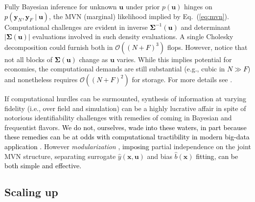 \documentclass[12pt]{article}
\newcommand{\blunew}[1]{\textcolor{black}{#1}} %
\begin{document}
Fully Bayesian inference for unknown $\mathbf{u}$
under prior $p(\mathbf{u})$ hinges on \blunew{$p(
\mathbf{y}_{N}, \mathbf{y}_{F} \mid \mathbf{u})$}, the MVN (marginal)
likelihood implied by Eq.~(\ref{eq:mvn}). Computational challenges
are evident in inverse \blunew{$\mathbf{\Sigma}^{-1}(\mathbf{u})$} and determinant
\blunew{$|\mathbf{\Sigma}(\mathbf{u})|$} evaluations involved in such density evaluations. A
single Cholesky decomposition could furnish both in \blunew{$\mathcal{O}((N+F)^3)$}
flops. However, notice that not all blocks of
\blunew{$\mathbf{\Sigma}(\mathbf{u})$} change as $\mathbf{u}$ varies. While this implies
potential for economies, the computational demands are still
substantial (e.g., cubic in \blunew{$N \gg F$}) and nonetheless requires
\blunew{$\mathcal{O}((N+F)^2)$} for storage. For more details see \citet[][Section
8.1]{gramacy2020surrogates}.

If computational hurdles can be surmounted, synthesis of information at
varying fidelity (i.e., over field and simulation) can be a highly lucrative
affair in spite of notorious identifiability challenges 
with remedies of coming in Bayesian
\citep{Higdon:2004, bryn2014learning, plumlee2017bayesian, Gu:2018} and
frequentist \citep{tuo2015,tuo2016,wong2017,plumlee2019} flavors. \blunew{We
do not, ourselves, wade into these waters, in part because these remedies can
be at odds with computational tractibility in modern big-data application
\citep{marmin2022deep}.} However {\em modularization} \cite{Liu:2009},
\blunew{imposing} partial independence on the joint MVN structure, separating
surrogate $\hat{y}(\mathbf{x},
\mathbf{u})$ and bias $\hat{b}(\mathbf{x})$ \blunew{fitting}, 
\blunew{can be both simple and effective.}

\subsection{Scaling up}
\end{document}
